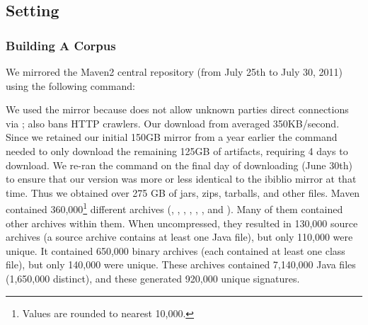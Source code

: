 

\subsection{Setting}


\subsubsection{Building A Corpus}

We mirrored the Maven2 central repository (from July 25th to July 30, 2011) using the
following command:

\hspace{2em} 
\vspace{0.3em}

We used the  mirror because 
does not allow unknown parties direct connections via ;
 also bans HTTP crawlers.
Our download from  averaged 350KB/second.
Since we retained our initial 150GB mirror from a year earlier
the  command needed to only download the remaining 125GB
of artifacts, requiring 4 days to download.  We re-ran the  command
on the final day of downloading (June 30th)
to ensure that our version was more or less identical to the ibiblio
mirror at that time.
Thus we obtained over 275 GB of jars, zips, tarballs, and other files.
Maven contained 360,000\footnote{Values are rounded to nearest 10,000.}
different archives (, , , ,
, , and ). Many of them contained other
archives within them.  When uncompressed, they resulted in 130,000
source archives (a source archive contains at least one Java file), but
only 110,000
were unique.  It contained 650,000
binary archives (each contained at least one class file), but only 140,000
were unique.  These archives contained 7,140,000
Java files (1,650,000
distinct), and these generated 920,000 unique signatures.

